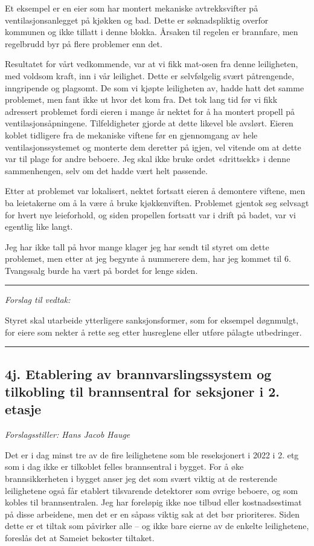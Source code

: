 \documentclass[12pt]{article}
\begin{document}
Et eksempel er en eier som har montert mekaniske avtrekksvifter på ventilasjonsanlegget på kjøkken
og bad. Dette er søknadspliktig overfor kommunen og ikke tillatt i denne blokka. Årsaken til
regelen er brannfare, men regelbrudd byr på flere problemer enn det.

Resultatet for vårt vedkommende, var at vi fikk mat-osen fra denne leiligheten, med voldsom kraft,
inn i vår leilighet. Dette er selvfølgelig svært påtrengende, inngripende og plagsomt. De som vi
kjøpte leiligheten av, hadde hatt det samme problemet, men fant ikke ut hvor det kom fra. Det tok
lang tid før vi fikk adressert problemet fordi eieren i mange år nektet for å ha montert propell på
ventilasjonsåpningene. Tilfeldigheter gjorde at dette likevel ble avslørt. Eieren koblet tidligere
fra de mekaniske viftene før en gjennomgang av hele ventilasjonssystemet og monterte dem deretter
på igjen, vel vitende om at dette var til plage for andre beboere. Jeg skal ikke bruke ordet
«drittsekk» i denne sammenhengen, selv om det hadde vært helt passende.

Etter at problemet var lokalisert, nektet fortsatt eieren å demontere viftene, men ba leietakerne
om å la være å bruke kjøkkenviften. Problemet gjentok seg selvsagt for hvert nye leieforhold, og
siden propellen fortsatt var i drift på badet, var vi egentlig like langt.

Jeg har ikke tall på hvor mange klager jeg har sendt til styret om dette problemet, men etter at
jeg begynte å nummerere dem, har jeg kommet til 6. Tvangssalg burde ha vært på bordet for lenge
siden.

{\rule{\textwidth}{0.3pt}}

{\em Forslag til vedtak:}

Styret skal utarbeide ytterligere sanksjonsformer, som for eksempel døgnmulgt, for eiere som
nekter å rette seg etter husreglene eller utføre pålagte utbedringer.\\
{\rule{\textwidth}{0.3pt}}

\subsection*{4j. Etablering av brannvarslingssystem og tilkobling til brannsentral for seksjoner i 2. etasje}

{\em Forslagsstiller: Hans Jacob Hauge}

Det er i dag minst tre av de fire leilighetene som ble reseksjonert i 2022 i 2. etg som i dag ikke
er tilkoblet felles brannsentral i bygget. For å øke brannsikkerheten i bygget anser jeg det som
svært viktig at de resterende leilighetene også får etablert tilsvarende detektorer som øvrige
beboere, og som kobles til brannsentralen. Jeg har foreløpig ikke noe tilbud eller kostnadsestimat
på disse arbeidene, men det er en såpass viktig sak at det bør prioriteres. Siden dette er et
tiltak som påvirker alle – og ikke bare eierne av de enkelte leilighetene, foreslås det at Sameiet
bekoster tiltaket.
\end{document}
